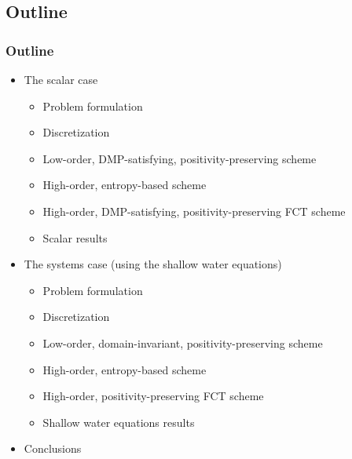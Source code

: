\subsection{Outline}
\begin{frame}
\frametitle{Outline}

\begin{itemize}
   \item The scalar case
   \begin{itemize}
      \item Problem formulation
      \item Discretization
      \item Low-order, DMP-satisfying, positivity-preserving scheme
      \item High-order, entropy-based scheme
      \item High-order, DMP-satisfying, positivity-preserving FCT scheme
      \item Scalar results
   \end{itemize}
   \item The systems case (using the shallow water equations)
   \begin{itemize}
      \item Problem formulation
      \item Discretization
      \item Low-order, domain-invariant, positivity-preserving scheme
      \item High-order, entropy-based scheme
      \item High-order, positivity-preserving FCT scheme
      \item Shallow water equations results
   \end{itemize}
   \item Conclusions
\end{itemize}

\end{frame}
